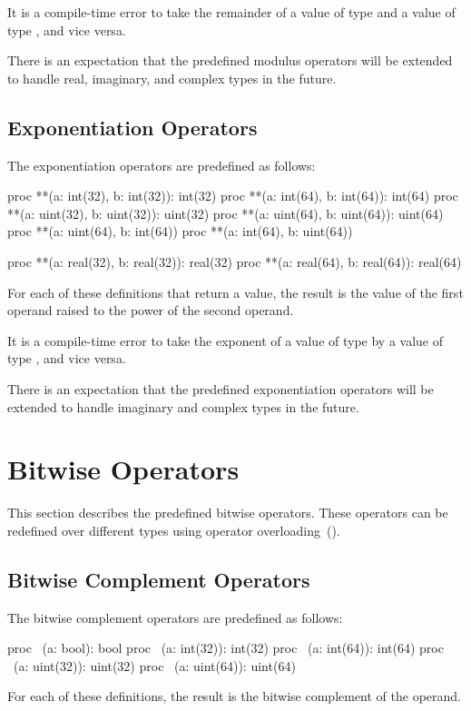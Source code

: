 It is a compile-time error to take the remainder of a value of
type  and a value of type , and vice
versa.

There is an expectation that the predefined modulus operators will be
extended to handle real, imaginary, and complex types in the future.

\subsection{Exponentiation Operators}
\label{Exponentiation_Operators}

The exponentiation operators are predefined as follows:
\begin{chapel}
proc **(a: int(32), b: int(32)): int(32)
proc **(a: int(64), b: int(64)): int(64)
proc **(a: uint(32), b: uint(32)): uint(32)
proc **(a: uint(64), b: uint(64)): uint(64)
proc **(a: uint(64), b: int(64))
proc **(a: int(64), b: uint(64))

proc **(a: real(32), b: real(32)): real(32)
proc **(a: real(64), b: real(64)): real(64)
\end{chapel}
For each of these definitions that return a value, the result is the
value of the first operand raised to the power of the second operand.

It is a compile-time error to take the exponent of a value of
type  by a value of type , and vice
versa.

There is an expectation that the predefined exponentiation operators
will be extended to handle imaginary and complex types in the future.

\section{Bitwise Operators}
\label{Bitwise_Operators}

This section describes the predefined bitwise operators.  These
operators can be redefined over different types using operator
overloading~().

\subsection{Bitwise Complement Operators}
\label{Bitwise_Complement_Operators}

The bitwise complement operators are predefined as follows:
\begin{chapel}
proc ~(a: bool): bool
proc ~(a: int(32)): int(32)
proc ~(a: int(64)): int(64)
proc ~(a: uint(32)): uint(32)
proc ~(a: uint(64)): uint(64)
\end{chapel}
For each of these definitions, the result is the bitwise complement of
the operand.


